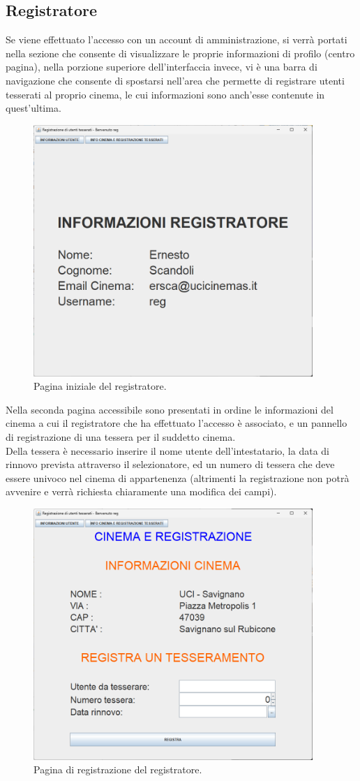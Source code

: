 \documentclass[a4paper,12pt]{report}
\begin{document}
\subsection{Registratore}
Se viene effettuato l'accesso con un account di amministrazione, si verrà portati nella sezione che consente di visualizzare le proprie informazioni di profilo (centro pagina), nella porzione superiore dell'interfaccia invece, vi è una barra di navigazione che consente di spostarsi nell'area che permette di registrare utenti tesserati al proprio cinema, le cui informazioni sono anch'esse contenute in quest'ultima.
\begin{figure}[H]
	\centering
	\includegraphics[width=300pt]{appimg/reginfojw.png}
	\caption{Pagina iniziale del registratore.}
\end{figure}
Nella seconda pagina accessibile sono presentati in ordine le informazioni del cinema a cui il registratore che ha effettuato l'accesso è associato, e un pannello di registrazione di una tessera per il suddetto cinema.\\
Della tessera è necessario inserire il nome utente dell'intestatario, la data di rinnovo prevista attraverso il selezionatore, ed un numero di tessera che deve essere univoco nel cinema di appartenenza (altrimenti la registrazione non potrà avvenire e verrà richiesta chiaramente una modifica dei campi).
\begin{figure}[H]
	\centering
	\includegraphics[width=300pt]{appimg/regregjw.png}
	\caption{Pagina di registrazione del registratore.}
\end{figure}
\end{document}
